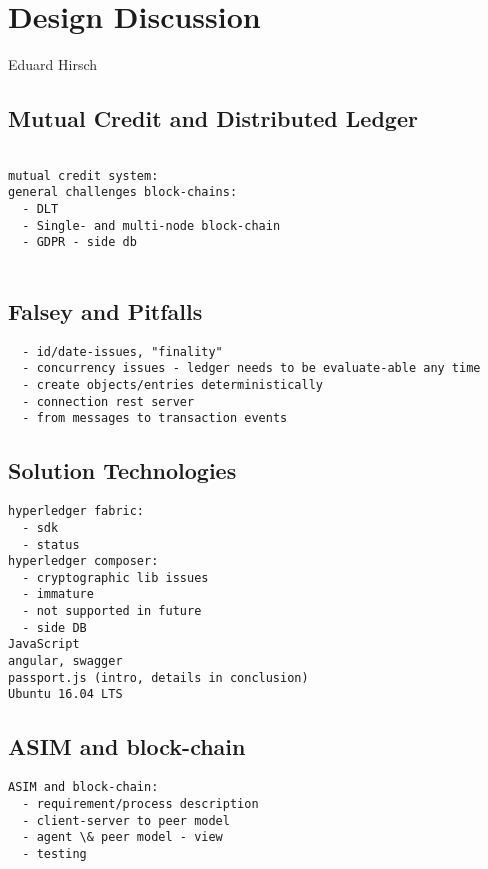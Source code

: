 \chapter{Design Discussion}
\label{ch:design}

\vspace{-1cm}
\begin{center}
Eduard Hirsch
\end{center}

\section{Mutual Credit and Distributed Ledger}
\label{sec:dlt} 

\begin{verbatim}

mutual credit system:
general challenges block-chains:
  - DLT
  - Single- and multi-node block-chain
  - GDPR - side db
  
\end{verbatim}
  
\section{Falsey and Pitfalls}

\begin{verbatim}
  - id/date-issues, "finality"
  - concurrency issues - ledger needs to be evaluate-able any time
  - create objects/entries deterministically
  - connection rest server
  - from messages to transaction events
\end{verbatim}

\section{Solution Technologies}
\label{sec:solution}

\begin{verbatim}
hyperledger fabric:
  - sdk
  - status
hyperledger composer:
  - cryptographic lib issues
  - immature
  - not supported in future
  - side DB
JavaScript
angular, swagger
passport.js (intro, details in conclusion)
Ubuntu 16.04 LTS
\end{verbatim}


\section{ASIM and block-chain}
\label{sec:asim}

\begin{verbatim}
ASIM and block-chain:
  - requirement/process description
  - client-server to peer model
  - agent \& peer model - view 
  - testing
\end{verbatim}